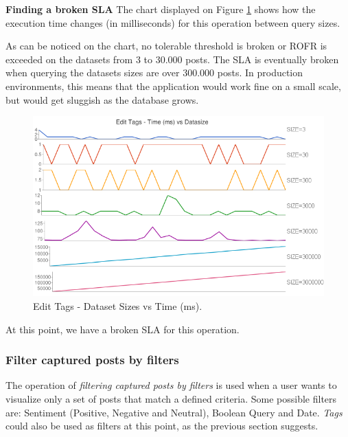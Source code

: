 \textbf{Finding a broken SLA}
The chart displayed on Figure \ref{fig:tags-scenairo-02-chart} shows how the execution time changes (in milliseconds) for this operation between query sizes. 

As can be noticed on the chart, no tolerable threshold is broken or ROFR is exceeded on the datasets from 3 to 30.000 posts. The SLA is eventually broken when querying the datasets sizes are over 300.000 posts. In production environments, this means that the application would work fine on a small scale, but would get sluggish as the database grows.

\begin{figure}[ht!]
\centering
\includegraphics[width=150mm]{Imagens/second-scenario.png}
\caption{Edit Tags - Dataset Sizes vs Time (ms).\label{fig:tags-scenairo-02-chart}}
\end{figure}

At this point, we have a broken SLA for this operation. 






\clearpage









\subsubsection{Filter captured posts by filters}

The operation of \textit{filtering captured posts by filters} is used when a user wants to visualize only a set of posts that match a defined criteria. Some possible filters are: Sentiment (Positive, Negative and Neutral), Boolean Query and Date. \textit{Tags} could also be used as filters at this point, as the previous section suggests. 


